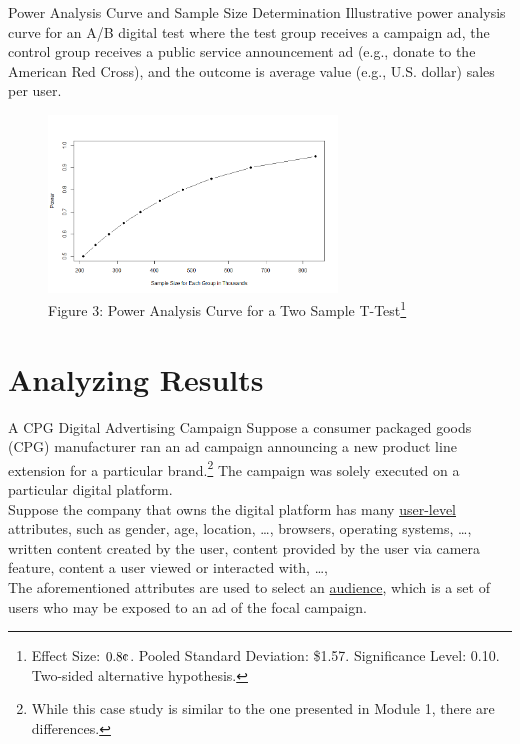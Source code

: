 \documentclass[pdf]{beamer}
\theoremstyle{remark}
\theoremstyle{definition}
\begin{document}
\begin{frame}[t]{Power Analysis Curve and Sample Size Determination}
\small
Illustrative power analysis curve for an A/B digital test where the test group receives a campaign ad, the control group receives a public service announcement ad (e.g., donate to the American Red Cross), and the outcome is average value (e.g., U.S. dollar) sales per user.  \\
\vspace{-2.0ex}
\begin{figure}[htbp]
  \captionsetup{justification=centering}
  \includegraphics[height=4.7cm, trim=0.0cm 0.3cm 0.0cm -0.8cm width=4.7cm]{Images/Illustrative_Power_Calculation.png}
  \caption{Figure {\color{franklinblue} 3}: Power Analysis Curve for a Two Sample T-Test\footnote{Effect Size: $0.8\vcenter{\hbox{\mbox{\textcent}}}$.  Pooled Standard Deviation: \$1.57. Significance Level: 0.10. Two-sided alternative hypothesis.}}
\end{figure}
\end{frame}

\section{Analyzing Results}

\begin{frame}[t]{A CPG Digital Advertising Campaign}
Suppose a consumer packaged goods (CPG) manufacturer ran an ad campaign announcing a new product line extension for a particular brand.\footnote{While this case study is similar to the one presented in Module 1, there are differences.}  The campaign was solely executed on a particular digital platform.  \\
\vspace{1.5ex}
Suppose the company that owns the digital platform has many \underline{user-level} attributes, such as gender, age, location, \ldots, browsers, operating systems, \ldots, written content created by the user, content provided by the user via camera feature,  content a user viewed or interacted with,  \ldots,  \\
\vspace{1.5ex}
The aforementioned attributes are used to select an \underline{audience}, which is a set of users who may be exposed to an ad of the focal campaign. 
\end{frame}
\end{document}
